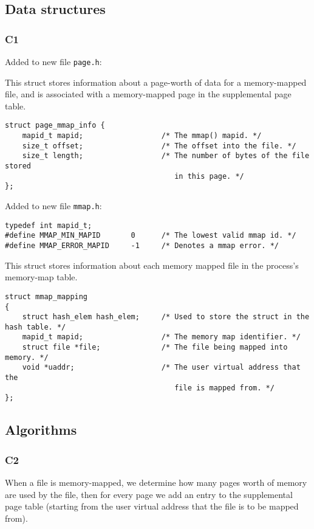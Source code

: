 \documentclass[a4wide, 11pt]{article}
\newcommand{\tx}{\texttt}
\begin{document}
\subsection{Data structures}
\subsubsection{C1}
Added to new file \tx{page.h}:

This struct stores information about a page-worth of data for a memory-mapped file, and is associated with a memory-mapped page in the supplemental page table.
\begin{verbatim}
struct page_mmap_info {
    mapid_t mapid;                  /* The mmap() mapid. */
    size_t offset;                  /* The offset into the file. */
    size_t length;                  /* The number of bytes of the file stored
                                       in this page. */
};
\end{verbatim}

Added to new file \tx{mmap.h}:
\begin{verbatim}
typedef int mapid_t;
#define MMAP_MIN_MAPID       0      /* The lowest valid mmap id. */
#define MMAP_ERROR_MAPID     -1     /* Denotes a mmap error. */
\end{verbatim}

This struct stores information about each memory mapped file in the process's memory-map table.
\begin{verbatim}
struct mmap_mapping
{
    struct hash_elem hash_elem;     /* Used to store the struct in the hash table. */
    mapid_t mapid;                  /* The memory map identifier. */
    struct file *file;              /* The file being mapped into memory. */
    void *uaddr;                    /* The user virtual address that the
                                       file is mapped from. */
};
\end{verbatim}

\subsection{Algorithms}
\subsubsection{C2}

When a file is memory-mapped, we determine how many pages worth of memory are used by the file, then for every page we add an entry to the supplemental page table (starting from the user virtual address that the file is to be mapped from).
\end{document}
